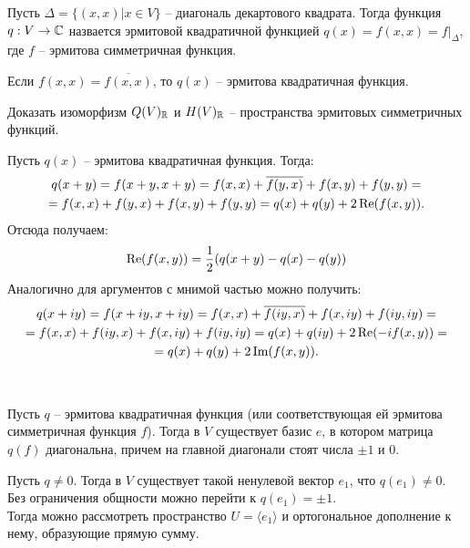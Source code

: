 \begin{definition}
    Пусть $\Delta = \{(x, x) \vert x \in V\}$ -- диагональ декартового квадрата. Тогда функция $q: V \to \mathbb{C}$ 
    назвается эрмитовой квадратичной функцией $q(x) = f(x, x) = f \vert_{\Delta}$, где $f$ -- эрмитова 
    симметричная функция.
\end{definition}

\begin{note}
    Если $f(x, x) = \overline{f(x, x)}$, то $q(x)$ -- эрмитова квадратичная функция.
\end{note}

\begin{exercise}
    Доказать изоморфизм $Q(V)_{\mathbb{R}}$ и $H(V)_{\mathbb{R}}$ -- пространства эрмитовых симметричных функций.
\end{exercise}

\begin{idea}
    Пусть $q(x)$ -- эрмитова квадратичная функция. Тогда: \begin{gather*}
        q(x + y) = f(x + y, x + y) = f(x, x) + \overline{f(y, x)} + f(x, y) + f(y, y) = \\ 
        = f(x, x) + f(y, x) + f(x, y) + f(y, y) = q(x) + q(y) + 2 \operatorname{Re}(f(x, y)).
    \end{gather*}
    Отсюда получаем: \begin{gather*}
        \operatorname{Re}(f(x, y)) = \frac{1}{2} (q(x+y) - q(x) - q(y))
    \end{gather*}
    Аналогично для аргументов с мнимой частью можно получить:
    \begin{gather*}
        q(x + iy) = f(x + iy, x + iy) = f(x, x) + \overline{f(iy, x)} + f(x, iy) + f(iy, iy) = \\ 
        =  f(x, x) + f(iy, x) + f(x, iy) + f(iy, iy) = q(x) + q(iy) + 2 \operatorname{Re}(-if(x, y)) = \\ 
        = q(x) + q(y) + 2 \operatorname{Im}(f(x, y)).
    \end{gather*}
\end{idea}

\begin{theorem}~

    Пусть $q$ -- эрмитова квадратичная функция (или соответствующая ей эрмитова симметричная функция $f$).
    Тогда в $V$ существует базис $e$, в котором матрица $q(f)$ диагональна, причем на главной диагонали 
    стоят числа $\pm 1$ и $0$.
\end{theorem}

\begin{idea}
    Пусть $q \neq 0$. Тогда в $V$ существует такой ненулевой вектор $e_1$, что $q(e_1) \neq 0$.
    Без ограничения общности можно перейти к $q(e_1) = \pm 1$. \\ Тогда можно рассмотреть пространство 
    $U = \langle e_1 \rangle$ и ортогональное дополнение к нему, образующие прямую сумму.
\end{idea}